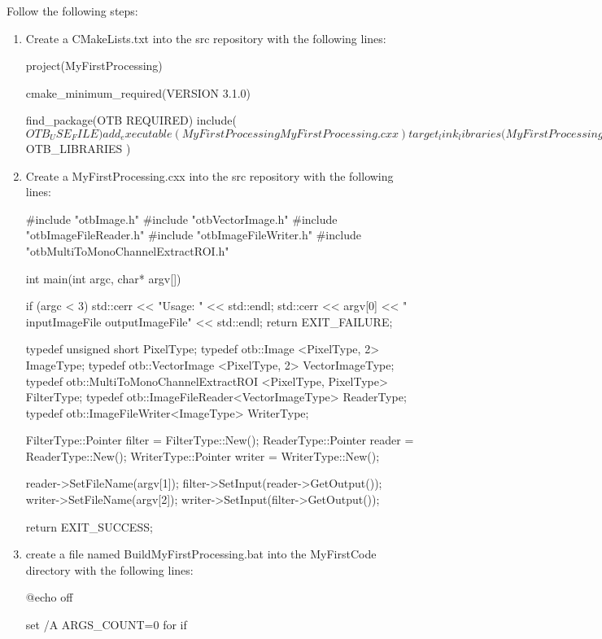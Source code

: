Follow the following steps:
\begin{enumerate}
\item Create a CMakeLists.txt into the src repository with the following lines:


\begin{cmakecode}
project(MyFirstProcessing)

cmake_minimum_required(VERSION 3.1.0)

find_package(OTB REQUIRED)
include(${OTB_USE_FILE})

add_executable(MyFirstProcessing MyFirstProcessing.cxx )

target_link_libraries(MyFirstProcessing ${OTB_LIBRARIES} )
\end{cmakecode}

\item Create a MyFirstProcessing.cxx into the src repository with the following lines:

\begin{cppcode}
#include "otbImage.h"
#include "otbVectorImage.h"
#include "otbImageFileReader.h"
#include "otbImageFileWriter.h"
#include "otbMultiToMonoChannelExtractROI.h"

int main(int argc, char* argv[])
{
  if (argc < 3)
  {
    std::cerr << "Usage: " << std::endl;
    std::cerr << argv[0] << "  inputImageFile  outputImageFile" << std::endl;
    return EXIT_FAILURE;
  }

  typedef unsigned short PixelType;
  typedef otb::Image <PixelType, 2> ImageType;
  typedef otb::VectorImage <PixelType, 2> VectorImageType;
  typedef otb::MultiToMonoChannelExtractROI <PixelType, PixelType> FilterType;
  typedef otb::ImageFileReader<VectorImageType> ReaderType;
  typedef otb::ImageFileWriter<ImageType> WriterType;

  FilterType::Pointer filter = FilterType::New();
  ReaderType::Pointer reader = ReaderType::New();
  WriterType::Pointer writer = WriterType::New();

  reader->SetFileName(argv[1]);
  filter->SetInput(reader->GetOutput());
  writer->SetFileName(argv[2]);
  writer->SetInput(filter->GetOutput());

  return EXIT_SUCCESS;
}
\end{cppcode}
\item create a file named BuildMyFirstProcessing.bat into the MyFirstCode directory with the following lines:
\begin{batcode}
@echo off

set /A ARGS_COUNT=0    
for %
if %


\end{batcode}
\end{enumerate}
